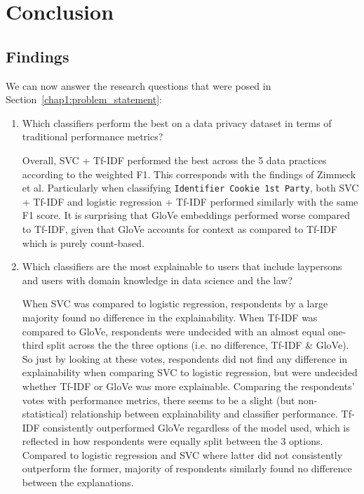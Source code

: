 \chapter{Conclusion} %
\label{chapter5} %

\section{Findings}
We can now answer the research questions that were posed in Section~\ref{chap1:problem_statement}:
\begin{enumerate}
    \item Which classifiers perform the best on a data privacy dataset in terms of traditional performance metrics?
    
    Overall, SVC + Tf-IDF performed the best across the 5 data practices according to the weighted F1. This corresponds with the findings of Zimmeck et al. Particularly when classifying \texttt{Identifier Cookie 1st Party}, both SVC + Tf-IDF and logistic regression + Tf-IDF performed similarly with the same F1 score. It is surprising that GloVe embeddings performed worse compared to Tf-IDF, given that GloVe accounts for context as compared to Tf-IDF which is purely count-based.

    \item Which classifiers are the most explainable to users that include laypersons and users with domain knowledge in data science and the law?
    
    When SVC was compared to logistic regression, respondents by a large majority found no difference in the explainability. When Tf-IDF was compared to GloVe, respondents were undecided with an almost equal one-third split across the the three options (i.e. no difference, Tf-IDF \& GloVe). So just by looking at these votes, respondents did not find any difference in explainability when comparing SVC to logistic regression, but were undecided whether Tf-IDF or GloVe was more explainable. Comparing the respondents' votes with performance metrics, there seems to be a slight (but non-statistical) relationship between explainability and classifier performance. Tf-IDF consistently outperformed GloVe regardless of the model used, which is reflected in how respondents were equally split between the 3 options. Compared to logistic regression and SVC where latter did not consistently outperform the former, majority of respondents similarly found no difference between the explanations. 


\end{enumerate}

